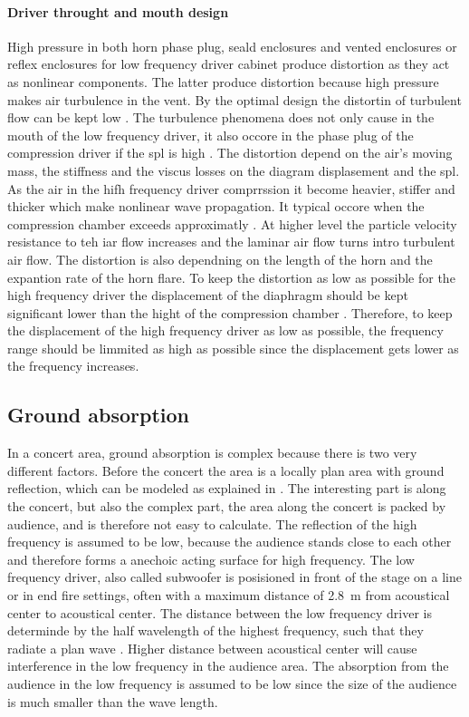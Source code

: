\paragraph{Driver throught and mouth design} High pressure in both horn phase plug, seald enclosures and vented enclosures or reflex enclosures for low frequency driver cabinet produce distortion as they act as nonlinear components. The latter produce distortion because high pressure makes air turbulence in the vent. By the optimal design the distortin of turbulent flow can be kept low \citep{roozen1998reduction}. The turbulence phenomena does not only cause in the mouth of the low frequency driver, it also occore in the phase plug of the compression driver if the \gls{spl} is high \citep{czerwinski1999air}. The distortion depend on the air's moving mass, the stiffness and the viscus losses on the diagram displasement and the \gls{spl}. As the air in the hifh frequency driver comprrssion it become heavier, stiffer and thicker which make nonlinear wave propagation. It typical occore when the compression chamber exceeds approximatly . At higher level the particle velocity resistance to teh iar flow increases and the laminar air flow turns intro turbulent air flow. The distortion is also dependning on the length of the horn and the expantion rate of the horn flare. To keep the distortion as low as possible for the high frequency driver the displacement of the diaphragm should be kept significant lower than the hight of the compression chamber \citep{voishvillo2004comparative}. Therefore, to keep the displacement of the high frequency driver as low as possible, the frequency range should be limmited as high as possible since the displacement gets lower as the frequency increases.



\subsection{Ground absorption} 
In a concert area, ground absorption is complex because there is two very different factors. Before the concert the area is a locally plan area with ground reflection, which can be modeled as explained in \citep{review_of_sound}. The interesting part is along the concert, but also the complex part, the area along the concert is packed by audience, and is therefore not easy to calculate. The reflection of the high frequency is assumed to be low, because the audience stands close to each other and therefore forms a anechoic acting surface for high frequency. The low frequency driver, also called subwoofer is posisioned in front of the stage on a line or in end fire settings, often with a maximum distance of \SI{2.8}{\meter} from acoustical center to acoustical center. The distance between the low frequency driver is determinde by the half wavelength of the highest frequency, such that they radiate a plan wave \citep{bauman2001wavefront}. Higher distance between acoustical center will cause interference in the low frequency in the audience area. The absorption from the audience in the low frequency is assumed to be low since the size of the audience is much smaller than the wave length.   


